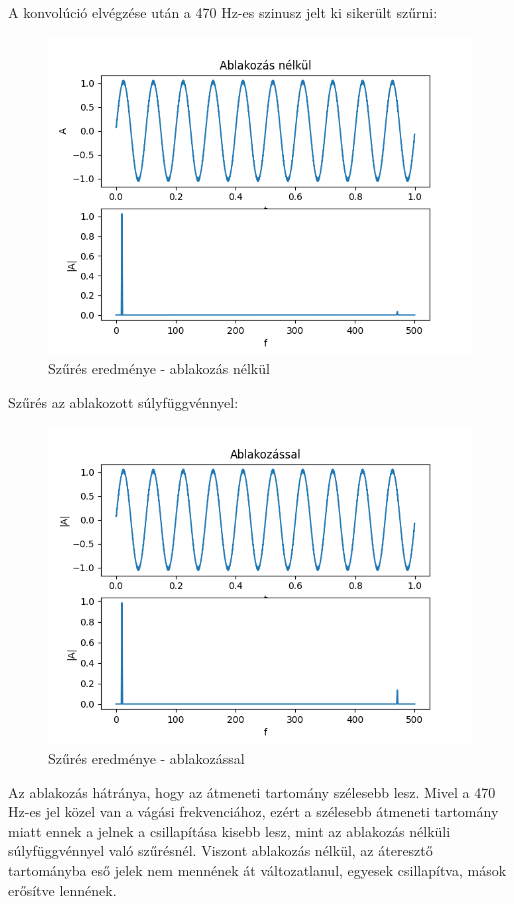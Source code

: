 A konvolúció elvégzése után a 470 Hz-es szinusz jelt ki sikerült szűrni: 

\begin{figure}[H]
    \centering
    \includegraphics[scale=0.6]{figures/fir_no_win.png}
    \caption{Szűrés eredménye - ablakozás nélkül}
\end{figure}

Szűrés az ablakozott súlyfüggvénnyel:

\begin{figure}[H]
    \centering
    \includegraphics[scale=0.6]{figures/fir_win.png}
    \caption{Szűrés eredménye - ablakozással}
\end{figure}

Az ablakozás hátránya, hogy az átmeneti tartomány szélesebb lesz. Mivel a 470 Hz-es jel közel van a vágási frekvenciához, ezért a szélesebb átmeneti tartomány miatt ennek a jelnek a csillapítása kisebb lesz, mint az ablakozás nélküli súlyfüggvénnyel való szűrésnél. Viszont ablakozás nélkül, az áteresztő tartományba eső jelek nem mennének át változatlanul, egyesek csillapítva, mások erősítve lennének.